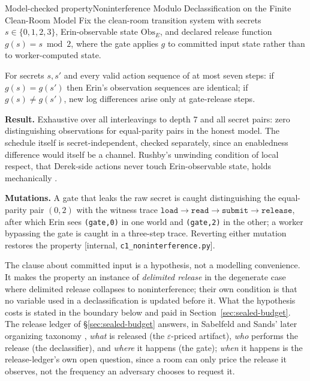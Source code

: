 \documentclass[11pt,a4paper]{article}
\theoremstyle{definition}
\begin{document}
\begin{pdclaim}{Model-checked property}{Noninterference Modulo Declassification on the Finite Clean-Room Model}
\setlength{\parskip}{4pt plus 1pt}
\label{thm:sealed-noninterference}
\relax
Fix the clean-room transition system with secrets $s\in\{0,1,2,3\}$,
Erin-observable state $\mathrm{Obs}_E$, and declared release function
$g(s)=s\bmod 2$, where the gate applies $g$ to committed input state rather
than to worker-computed state.

For secrets $s,s'$ and every valid action
sequence of at most seven steps: if $g(s)=g(s')$ then Erin's observation
\mbox{sequences} are identical; if $g(s)\neq g(s')$, new log differences arise
only at gate-release steps.

\par\noindent\textbf{Result.} Exhaustive over all interleavings to depth 7 and all secret
pairs: zero distinguishing observations for equal-parity pairs in the honest model. The schedule
itself is secret-independent, checked separately, since an enabledness
difference would itself be a channel. Rushby's unwinding condition of local
respect, that Derek-side actions never touch Erin-observable state, holds
mechanically .

\textbf{Mutations.} A gate that leaks the raw
secret is caught distinguishing the equal-parity pair $(0,2)$ with the witness
trace $\mathtt{load}\to\mathtt{read}\to\mathtt{submit}\to\mathtt{release}$,
after which Erin sees \texttt{(gate,0)} in one world and \texttt{(gate,2)} in
the other; a worker bypassing the gate is caught in a three-step trace.
Reverting either mutation restores the property [internal,
\texttt{c1\_noninterference.py}].
\end{pdclaim}

The clause about committed input is a hypothesis, not a modelling convenience.
It makes the property an instance of \emph{delimited release}  in
the degenerate case where delimited release collapses to noninterference;
their own condition is that no variable used in a declassification is updated
before it. What the hypothesis costs is stated in the boundary below and paid
in Section~\ref{sec:sealed-budget}. The release ledger of
\S\ref{sec:sealed-budget} answers, in Sabelfeld and Sands' later organizing
taxonomy , \emph{what} is released (the $\varepsilon$-priced
artifact), \emph{who} performs the release (the declassifier), and
\emph{where} it happens (the gate); \emph{when} it happens is the
release-ledger's own open question, since a room can only price the release
it observes, not the frequency an adversary chooses to request it.
\end{document}
